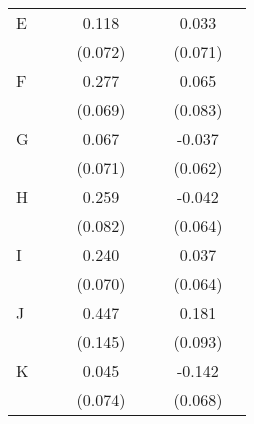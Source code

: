 \begin{longtable}{l*{3}{c}|l*{3}{c}}
	E                   &                     &                     &       0.118\sym{*}  &                     &                     &       0.033         \\
	&                     &                     &     (0.072)         &                     &                     &     (0.071)         \\
	F                   &                     &                     &       0.277\sym{***}&                     &                     &       0.065         \\
	&                     &                     &     (0.069)         &                     &                     &     (0.083)         \\
	G                   &                     &                     &       0.067         &                     &                     &      -0.037         \\
	&                     &                     &     (0.071)         &                     &                     &     (0.062)         \\
	H                   &                     &                     &       0.259\sym{***}&                     &                     &      -0.042         \\
	&                     &                     &     (0.082)         &                     &                     &     (0.064)         \\
	I                   &                     &                     &       0.240\sym{***}&                     &                     &       0.037         \\
	&                     &                     &     (0.070)         &                     &                     &     (0.064)         \\
	J                   &                     &                     &       0.447\sym{***}&                     &                     &       0.181\sym{*}  \\
	&                     &                     &     (0.145)         &                     &                     &     (0.093)         \\
	K                   &                     &                     &       0.045         &                     &                     &      -0.142\sym{**} \\
	&                     &                     &     (0.074)         &                     &                     &     (0.068)         \\

\end{longtable}
